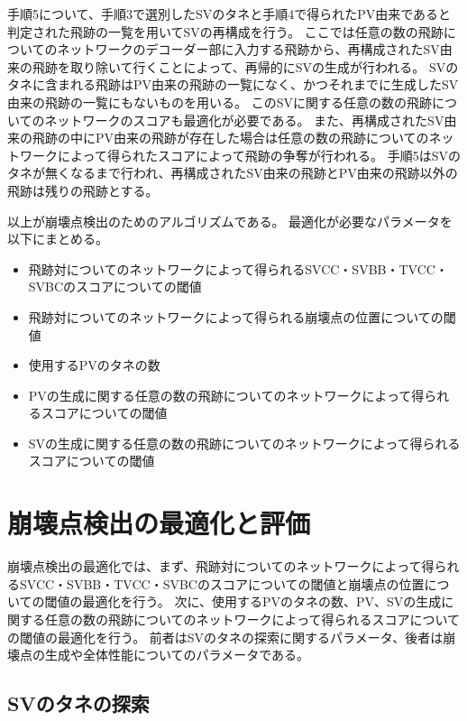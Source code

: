 手順5について、手順3で選別したSVのタネと手順4で得られたPV由来であると判定された飛跡の一覧を用いてSVの再構成を行う。
ここでは任意の数の飛跡についてのネットワークのデコーダー部に入力する飛跡から、再構成されたSV由来の飛跡を取り除いて行くことによって、再帰的にSVの生成が行われる。
SVのタネに含まれる飛跡はPV由来の飛跡の一覧になく、かつそれまでに生成したSV由来の飛跡の一覧にもないものを用いる。
このSVに関する任意の数の飛跡についてのネットワークのスコアも最適化が必要である。
また、再構成されたSV由来の飛跡の中にPV由来の飛跡が存在した場合は任意の数の飛跡についてのネットワークによって得られたスコアによって飛跡の争奪が行われる。
手順5はSVのタネが無くなるまで行われ、再構成されたSV由来の飛跡とPV由来の飛跡以外の飛跡は残りの飛跡とする。

以上が崩壊点検出のためのアルゴリズムである。
最適化が必要なパラメータを以下にまとめる。

\begin{itemize}
 \item 飛跡対についてのネットワークによって得られるSVCC・SVBB・TVCC・SVBCのスコアについての閾値
 \item 飛跡対についてのネットワークによって得られる崩壊点の位置についての閾値
 \item 使用するPVのタネの数
 \item PVの生成に関する任意の数の飛跡についてのネットワークによって得られるスコアについての閾値
 \item SVの生成に関する任意の数の飛跡についてのネットワークによって得られるスコアについての閾値
\end{itemize}


\section{崩壊点検出の最適化と評価} \label{VFDL:TuneandPerformanceofVFDL}

崩壊点検出の最適化では、まず、飛跡対についてのネットワークによって得られるSVCC・SVBB・TVCC・SVBCのスコアについての閾値と崩壊点の位置についての閾値の最適化を行う。
次に、使用するPVのタネの数、PV、SVの生成に関する任意の数の飛跡についてのネットワークによって得られるスコアについての閾値の最適化を行う。
前者はSVのタネの探索に関するパラメータ、後者は崩壊点の生成や全体性能についてのパラメータである。


\subsection{SVのタネの探索} \label{VFDL:TPVFDL:SVSeedSelection}

